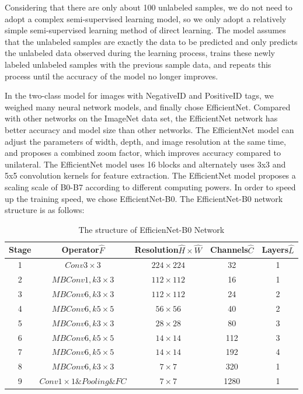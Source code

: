 \documentclass{mcmthesis}
\numberwithin{figure}{section}
\numberwithin{table}{section}
\begin{document}
Considering that there are only about 100 unlabeled samples, we do not need to adopt a complex semi-supervised learning model, so we only adopt a relatively simple semi-supervised learning method of direct learning. The model assumes that the unlabeled samples are exactly the data to be predicted and only predicts the unlabeled data observed during the learning process, trains these newly labeled unlabeled samples with the previous sample data, and repeats this process until the accuracy of the model no longer improves.

In the two-class model for images with NegativeID and PositiveID tags, we weighed many neural network models, and finally chose EfficientNet. Compared with other networks on the ImageNet data set, the EfficientNet network has better accuracy and model size than other networks. The EfficientNet model can adjust the parameters of width, depth, and image resolution at the same time, and proposes a combined zoom factor, which improves accuracy compared to unilateral. The EfficientNet model uses 16 blocks and alternately uses 3x3 and 5x5 convolution kernels for feature extraction. The EfficientNet model proposes a scaling scale of B0-B7 according to different computing powers. In order to speed up the training speed, we chose EfficientNet-B0. The EfficientNet-B0 network structure is as follows: 

\begin{table}[]
  \centering
  \begin{tabular}{ccccc}
  \hline
  Stage & Operator$\hat F$               & Resolution$\hat H\times \hat W$ & Channels$\hat C$ & Layers$\hat L$ \\ \hline
  1     & $Conv3\times3$                 & $224\times 224$                 & 32               & 1              \\
  2     & $MBConv1,k3\times 3$           & $112\times 112$                 & 16               & 1              \\
  3     & $MBConv6,k3\times 3$           & $112\times 112$                 & 24               & 2              \\
  4     & $MBConv6,k5\times 5$           & $56\times 56$                   & 40               & 2              \\
  5     & $MBConv6,k3\times 3 $          & $28\times 28$                   & 80               & 3              \\
  6     & $MBConv6,k5\times 5 $          & $14\times 14$                   & 112              & 3              \\
  7     & $MBConv6,k5\times  5$          & $14\times 14$                   & 192              & 4              \\
  8     & $MBConv6,k3 \times 3 $         & $7\times 7$                     & 320              & 1              \\
  9     & $Conv1\times 1\& Pooling\& FC$ & $7\times 7$                     & 1280             & 1              \\ \hline
  \end{tabular}
  \caption{The structure of EfficienNet-B0 Network}
  \end{table}
  
\end{document}
